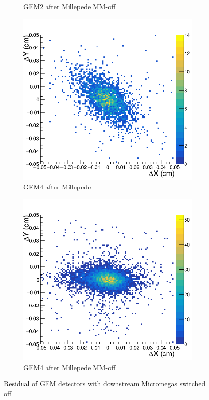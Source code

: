 \begin{figure}[h!]
\begin{subfigure}[r]{.45\textwidth}
  \caption{GEM2 after Millepede MM-off}
  \label{fig:GEM2_MXoff}
\end{subfigure}
\begin{subfigure}[l]{.45\textwidth}
  \centering
  \includegraphics[width=\linewidth]{thesis_figures/alignment/Run_3211_after_millepede/square/GEM4.png}
  \caption{GEM4 after Millepede}
\end{subfigure}
\begin{subfigure}[r]{.45\textwidth}
  \centering
  \includegraphics[width=\linewidth]{thesis_figures/alignment/Run_3211_after_millepede/Micromegas_off/GEM4.png}
  \caption{GEM4 after Millepede MM-off}
  \label{fig:GEM4_MXoff}
\end{subfigure}
\caption{Residual of GEM detectors with downstream Micromegas switched off}
\label{fig:MX_off}
\end{figure}
\FloatBarrier

